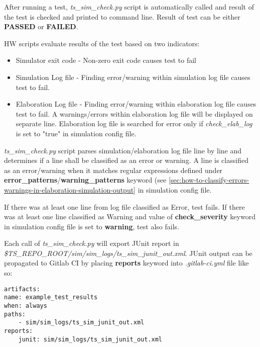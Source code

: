 \documentclass{tropic_design_spec}
\begin{document}
After running a test, \textit{ts_sim_check.py} script is automatically called and
result of the test is checked and printed to command line. Result of test can be either
\textbf{PASSED} or \textbf{FAILED}.

HW scripts evaluate results of the test based on two indicators:
\begin{itemize}
    \item Simulator exit code - Non-zero exit code causes test to fail
    \item Simulation Log file - Finding error/warning within simulation log
                                file causes test to fail.
    \item Elaboration Log file - Finding error/warning within elaboration log
                                file causes test to fail. A warnings/errors within elaboration
                                log file will be displayed on separate line. Elaboration log
                                file is searched for error only if \textit{check_elab_log} is set
                                to "true" in simulation config file.
\end{itemize}

\textit{ts_sim_check.py} script parses simulation/elaboration log file line by line and
determines if a line shall be classified as an error or warning. A line is classified
as an error/warning when it matches regular expressions defined under
\textbf{error_patterns}/\textbf{warning_patterns} keyword (see
\ref{sec:how-to-classify-errors-warnings-in-elaboration-simulation-output} in simulation
config file.

If there was at least one line from log file classified as Error, test fails.
If there was at least one line classified as Warning and value of
\textbf{check_severity} keyword in simulation config file is set to
\textbf{warning}, test also fails.


Each call of \textit{ts_sim_check.py} will export JUnit report in
\textit{\$TS_REPO_ROOT/sim/sim_logs/ts_sim_junit_out.xml}. JUnit output can be
propagated to Gitlab CI by placing \textbf{reports} keyword into \textit{.gitlab-ci.yml}
file like so:

\begin{lstlisting}
artifacts:
name: example_test_results
when: always
paths:
    - sim/sim_logs/ts_sim_junit_out.xml
reports:
    junit: sim/sim_logs/ts_sim_junit_out.xml
\end{lstlisting}
\end{document}
